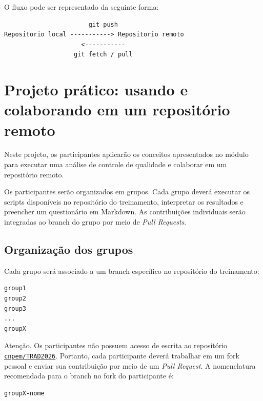 \documentclass[12pt,a4paper]{article}
\begin{document}
O fluxo pode ser representado da seguinte forma: 

\begin{center}
  \begin{minipage}{0.62\textwidth}
    \begin{lstlisting}
                       git push 
Repositorio local -----------> Repositorio remoto 
                     <----------- 
                   git fetch / pull
    \end{lstlisting}
  \end{minipage}
\end{center}

\clearpage

\section{Projeto prático: usando e colaborando em um repositório remoto}

Neste projeto, os participantes aplicarão os conceitos apresentados no módulo para executar uma análise de controle de qualidade e colaborar em um repositório remoto. 

Os participantes serão organizados em grupos. Cada grupo deverá executar os scripts disponíveis no repositório do treinamento, interpretar os resultados e preencher um questionário em Markdown. As contribuições individuais serão integradas ao branch do grupo por meio de \textit{Pull Requests}.

\subsection{Organização dos grupos}

Cada grupo será associado a um branch específico no repositório do treinamento: 

\begin{lstlisting}
group1
group2
group3
...
groupX
\end{lstlisting}

\begin{question}{Atenção.}
\footnotesize Os participantes não possuem acesso de escrita ao repositório \href{https://github.com/cnpem/TRAD2026}{\texttt{cnpem/TRAD2026}}. Portanto, cada participante deverá trabalhar em um fork pessoal e enviar sua contribuição por meio de um \textit{Pull Request}. A nomenclatura recomendada para o branch no fork do participante é: 
\begin{lstlisting}
groupX-nome
\end{lstlisting}
\end{question}
\end{document}
